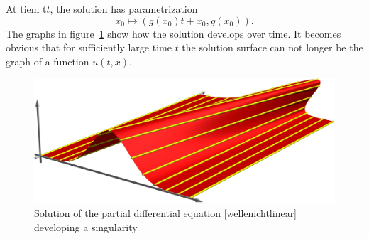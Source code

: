 At tiem t$t$, the solution has parametrization
\[
x_0\mapsto (g(x_0)t+x_0,g(x_0)).
\]
The graphs in figure~\ref{g} show how the solution develops over time.
It becomes obvious that for sufficiently large time $t$ the solution
surface can not longer be the graph of a function $u(t,x)$.

\begin{figure}
\begin{center}
\includegraphics[width=\hsize]{../common/graphics/welle.jpg}
\end{center}
\caption{Solution of the partial differential equation
\eqref{wellenichtlinear} developing a singularity \label{g}}
\end{figure}

